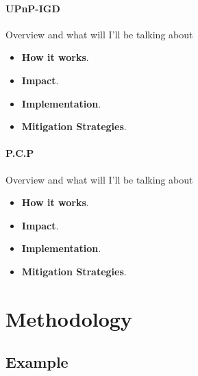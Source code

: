 \documentclass[iwp,first]{luthesis}
\begin{document}
\subsubsection {UPnP-IGD}

Overview and what will I'll be talking about

\begin{itemize}

	\item {\bf How it works}.

	\item {\bf Impact}.
 
	\item {\bf Implementation}.

	\item {\bf Mitigation Strategies}.

\end{itemize}


\subsubsection {P.C.P}

Overview and what will I'll be talking about

\begin{itemize}

	\item {\bf How it works}.

	\item {\bf Impact}.
 
	\item {\bf Implementation}.

	\item {\bf Mitigation Strategies}.

\end{itemize}
















\chapter{Methodology}

\section{Example}
\end{document}
